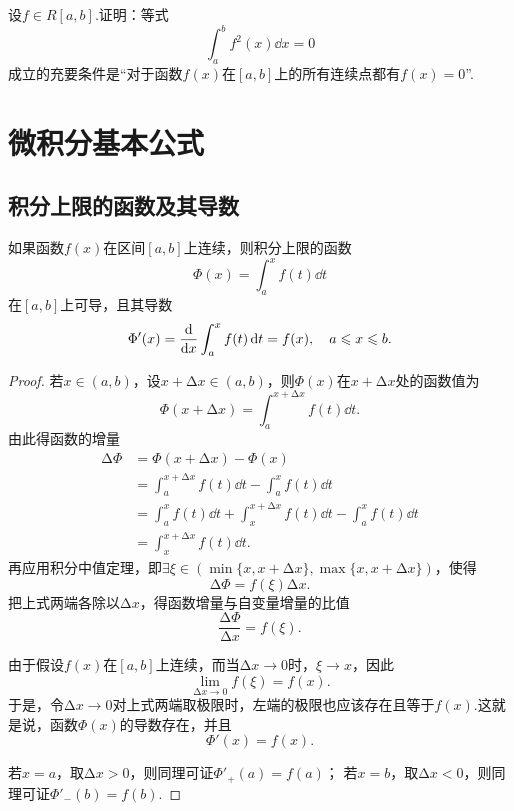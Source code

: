 \begin{example}
设\(f \in R[a,b]\).证明：等式\[
\int_a^b f^2(x) \dd{x} = 0
\]成立的充要条件是“对于函数\(f(x)\)在\([a,b]\)上的所有连续点都有\(f(x)=0\)”.
\end{example}

\section{微积分基本公式}
\subsection{积分上限的函数及其导数}
\begin{theorem}[变限积分可导定理]\label{theorem:定积分.变限积分可导定理}
如果函数\(f(x)\)在区间\([a,b]\)上连续，则积分上限的函数\[
\Phi(x) = \int_a^x{f(t)\dd{t}}
\]在\([a,b]\)上可导，且其导数\[
\Phi'(x) = \dv{x} \int_a^x{f(t)\dd{t}} = f(x),
\quad a \leqslant x \leqslant b.
\]
\begin{proof}
若\(x\in(a,b)\)，设\(x + \increment x \in (a,b)\)，则\(\Phi(x)\)在\(x + \increment x\)处的函数值为\[
\Phi(x + \increment x) = \int_a^{x+\increment x} f(t) \dd{t}.
\]由此得函数的增量\begin{align*}
\increment{\Phi}
&= \Phi(x + \increment x) - \Phi(x) \\
&= \int_a^{x+\increment x} f(t) \dd{t} - \int_a^x f(t) \dd{t} \\
&= \int_a^x f(t) \dd{t} + \int_x^{x+\increment x} f(t) \dd{t} - \int_a^x f(t) \dd{t} \\
&= \int_x^{x+\increment x} f(t) \dd{t}.
\end{align*}
再应用积分中值定理，即\(\exists\xi\in( \min\{x,x+\increment x\}, \max\{x,x+\increment x\} )\)，使得\[
\increment{\Phi} = f(\xi) \increment x.
\]把上式两端各除以\(\increment x\)，得函数增量与自变量增量的比值\[
\frac{\increment{\Phi}}{\increment x} = f(\xi).
\]

由于假设\(f(x)\)在\([a,b]\)上连续，而当\(\increment x\to0\)时，\(\xi \to x\)，因此\[
\lim\limits_{\increment x\to0} f(\xi) = f(x).
\]
于是，令\(\increment x\to0\)对上式两端取极限时，左端的极限也应该存在且等于\(f(x)\).这就是说，函数\(\Phi(x)\)的导数存在，并且\[
\Phi'(x) = f(x).
\]

若\(x = a\)，取\(\increment x > 0\)，则同理可证\(\Phi'_+(a)=f(a)\)；
若\(x = b\)，取\(\increment x < 0\)，则同理可证\(\Phi'_-(b)=f(b)\).
\end{proof}
\end{theorem}

